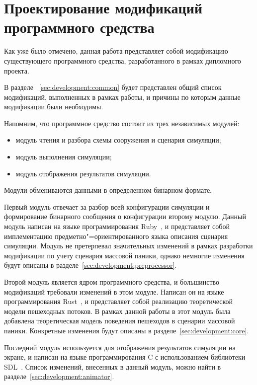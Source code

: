 \section{Проектирование модификаций программного средства} %
\label{sec:development}

Как уже было отмечено, данная работа представляет собой модификацию существующего программного средства, разработанного в рамках дипломного проекта.

В разделе ~\ref{sec:development:common} будет представлен общий список модификаций, выполненных в рамках работы,
и причины по которым данные модификации были необходимы.

Напомним, что программное средство состоит из трех независимых модулей:

\begin{itemize}
  \item модуль чтения и разбора схемы сооружения и сценария симуляции;
  \item модуль выполнения симуляции;
  \item модуль отображения результатов симуляции.
\end{itemize}

Модули обмениваются данными в определенном бинарном формате.

Первый модуль отвечает за разбор всей конфигурации симуляции и формирование бинарного сообщения о конфигурации второму модулю.
Данный модуль написан на языке программирования Ruby~\cite{ruby_doc}, и представляет собой имплементацию предметно"=ориентированного языка описания сценария симуляции.
Модуль не претерпевал значительных изменений в рамках разработки модификации по учету сценария массовой паники,
однако немногие изменения будут описаны в разделе~\ref{sec:development:preprocessor}.

Второй модуль является ядром программного средства, и большинство модификаций требовали изменений в этом модуле.
Написан он на языке программирования Rust~\cite{rust_doc}, и представляет собой реализацию теоретической модели пешеходных потоков.
В рамках данной работы в этот модуль была добавлена теоретическая модель поведения пешеходов в сценарии массовой паники.
Конкретные изменения будут описаны в разделе~\ref{sec:development:core}.

Последний модуль используется для отображения результатов симуляции на экране,
и написан на языке программирования C с использованием библиотеки SDL~\cite{libsdl_home}.
Список изменений, внесенных в данный модуль, можно найти в разделе~\ref{sec:development:animator}.


